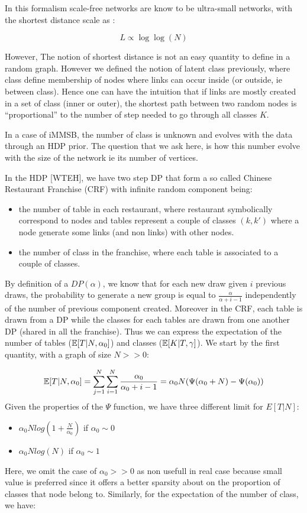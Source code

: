 \documentclass[a4paper, 12pt]{article}
\begin{document}
In this formalism scale-free networks are know to be ultra-small
networks, with the shortest distance scale as \cite{cohen2003scale}:

\begin{equation}
L \propto \log\log(N)
\end{equation}

However, The notion of shortest distance is not an easy quantity to define in a
random graph. However we defined the notion of latent class previously,
where class define membership of nodes where links can occur inside (or
outside, ie between class). Hence one can have the
intuition that if links are mostly created in a set of class (inner or
outer), the shortest path between two random nodes is
``proportional'' to the number of step needed  to go through all classes $K$.

In a case of iMMSB, the number of class is unknown and evolves with the data through an HDP prior. The question that we ask here, is how this number evolve with the size of the network ie its number of vertices.

In the HDP {[}WTEH{]}, we have two step DP that form a so called Chinese
Restaurant Franchise (CRF) with infinite random component being:
\begin{itemize}
\item the number of
table in each restaurant, where restaurant symbolically correspond to
nodes and tables represent a couple of classes $(k,k')$ where a node generate some links (and non links) with other nodes. 
\item the
number of class in the franchise, where each table is associated to a couple of classes.
\end{itemize}

By definition of a \(DP(\alpha)\), we know that for each new draw given
\(i\) previous draws, the probability to generate a new group is equal
to \(\frac{\alpha}{\alpha +i-1}\) independently of the number of previous
component created. Moreover in the CRF, each table is drawn from a DP while the classes for each tables are drawn from one another DP (shared in all the franchise). Thus we can express the expectation of the number of tables ($\mathbb{E}[T|N, \alpha_0]$) and classes ($\mathbb{E}[K|T, \gamma]$). We start by the first quantity, with a graph of size $N >> 0$:

\begin{align}
\mathbb{E}[T|N, \alpha_0] = \sum_{j=1}^N\sum_{i=1}^N \frac{\alpha_0}{\alpha_0 +i-1} = \alpha_0 N (\Psi(\alpha_0+N) - \Psi(\alpha_0))
\end{align}
Given the properties of the $\Psi$ function, we have three different limit for $E[T|N]$:
\begin{itemize}
	\item $\alpha_0 N log(1+\frac{N}{\alpha_0})$ if  $\alpha_0 \sim 0$
	\item $\alpha_0 N log(N)$ if  $\alpha_0 \sim 1$
\end{itemize}
Here, we omit the case of $\alpha_0 >> 0$ as non usefull in real case because small value is preferred since it offers a better sparsity about on the proportion of classes that node belong to. Similarly, for the expectation of the number of class, we have:
\end{document}
